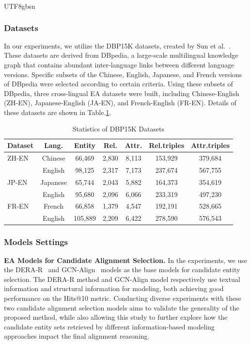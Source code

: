 \documentclass[preprint,12pt]{elsarticle}
\begin{document}
\begin{CJK}{UTF8}{gbsn}
\subsubsection{Datasets}
In our experiments, we utilize the DBP15K datasets, created by Sun et al.~\cite{jape}. These datasets are derived from DBpedia, a large-scale multilingual knowledge graph that contains abundant inter-language links between different language versions. Specific subsets of the Chinese, English, Japanese, and French versions of DBpedia were selected according to certain criteria. Using these subsets of DBpedia, three cross-lingual EA datasets were built, including Chinese-English (ZH-EN), Japanese-English (JA-EN), and French-English (FR-EN). Details of these datasets are shown in Table.\ref{tb:datasets}.
\begin{table}[h]
    \centering
    \caption{Statistics of DBP15K Datasets}
    \label{tb:datasets}
    \begin{tabular}{lcccccc}
        \toprule
        Dataset & Lang. & Entity & Rel. & Attr. & Rel.triples & Attr.triples \\
        \midrule
        ZH-EN & Chinese & 66,469 & 2,830 & 8,113 & 153,929 & 379,684 \\
        & English & 98,125 & 2,317 & 7,173 & 237,674 & 567,755 \\
        \midrule
        JP-EN & Japanese & 65,744 & 2,043 & 5,882 & 164,373 & 354,619 \\
        & English & 95,680 & 2,096 & 6,066 & 233,319 & 497,230 \\
        \midrule
        FR-EN & French & 66,858 & 1,379 & 4,547 & 192,191 & 528,665 \\
        & English & 105,889 & 2,209 & 6,422 & 278,590 & 576,543 \\
        \bottomrule
    \end{tabular}
\end{table}

\subsubsection{Models Settings}
\noindent\textbf{EA Models for Candidate Alignment Selection.} In the experiments, we use the DERA-R~\cite{dera} and GCN-Align~\cite{gcnalign} models as the base models for candidate entity selection. The DERA-R method and GCN-Align model respectively use textual information and structural information for modeling, both achieving good performance on the Hits@10 metric. Conducting diverse experiments with these two candidate alignment selection models aims to validate the generality of the proposed method, while also allowing this study to further explore how the candidate entity sets retrieved by different information-based modeling approaches impact the final alignment reasoning.


\end{CJK}
\end{document}
